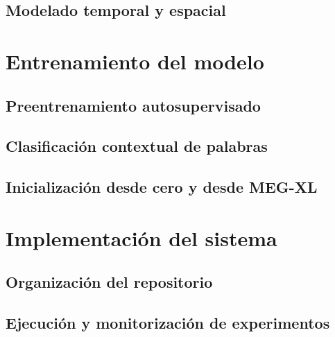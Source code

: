 \subsection{Modelado temporal y espacial}

\section{Entrenamiento del modelo}
\subsection{Preentrenamiento autosupervisado}
\subsection{Clasificación contextual de palabras}
\subsection{Inicialización desde cero y desde MEG-XL}

\section{Implementación del sistema}
\subsection{Organización del repositorio}
\subsection{Ejecución y monitorización de experimentos}


